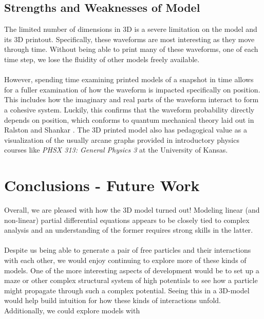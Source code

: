 \documentclass[12pt]{article}
\begin{document}
\subsection{Strengths and Weaknesses of Model}

The limited number of dimensions in 3D is a severe limitation on the model and its 3D printout. Specifically, these waveforms are most interesting as they move through time. Without being able to print many of these waveforms, one of each time step, we lose the fluidity of other models freely available.\\\\
However, spending time examining printed models of a snapshot in time allows for a fuller examination of how the waveform is impacted specifically on position. This includes how the imaginary and real parts of the waveform interact to form a cohesive system. Luckily, this confirms that the waveform probability directly depends on position, which conforms to quantum mechanical theory laid out in Ralston and Shankar \cite{Ralston} \cite{Shankar}. The 3D printed model also has pedagogical value as a visualization of the usually arcane graphs provided in introductory physics courses like \emph{PHSX 313: General Physics 3} at the University of Kansas.

\section{Conclusions - Future Work}

Overall, we are pleased with how the 3D model turned out! Modeling linear (and non-linear) partial differential equations appears to be closely tied to complex analysis and an understanding of the former requires strong skills in the latter. \\\\
Despite us being able to generate a pair of free particles and their interactions with each other, we would enjoy continuing to explore more of these kinds of models. One of the more interesting aspects of development would be to set up a maze or other complex structural system of high potentials to see how a particle might propagate through such a complex potential. Seeing this in a 3D-model would help build intuition for how these kinds of interactions unfold. Additionally, we could explore models with 
\newpage
\end{document}
